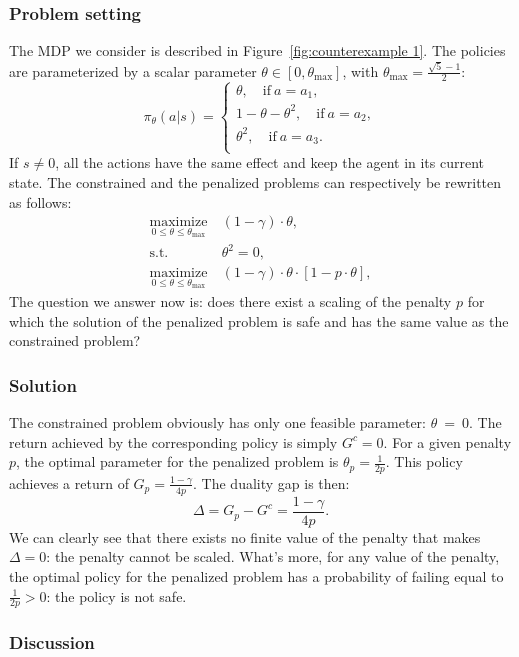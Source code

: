 \subsubsection{Problem setting} The MDP we consider is described in Figure~\ref{fig:counterexample 1}. The policies are parameterized by a scalar parameter $\theta\in[0,\theta_{\text{max}}]$, with $\theta_\text{max} = \frac{\sqrt{5}-1}{2}$:
$$
	\pi_\theta(a|s) = \begin{cases}
		\theta,\quad\text{if}~a=a_1,\\
		1 - \theta - \theta^2,\quad\text{if}~a=a_2,\\
		\theta^2,\quad\text{if}~a=a_3.\\
	\end{cases}
$$
If $s\neq0$, all the actions have the same effect and keep the agent in its current state. The constrained and the penalized problems can respectively be rewritten as follows:
\begin{align*}
	\underset{0\leq\theta\leq\theta_\text{max}}{\text{maximize}}&~(1-\gamma)\cdot\theta,\\
	\text{s.t.} &~\theta^2 = 0,\\
	\underset{0\leq\theta\leq\theta_\text{max}}{\text{maximize}}&~(1-\gamma)\cdot\theta\cdot\left[1 - p\cdot\theta\right],
\end{align*}
The question we answer now is: does there exist a scaling of the penalty $p$ for which the solution of the penalized problem is safe and has the same value as the constrained problem?

\subsubsection{Solution} The constrained problem obviously has only one feasible parameter: $\theta~=~0$. The return achieved by the corresponding policy is simply $G^c = 0$. For a given penalty $p$, the optimal parameter for the penalized problem is $\theta_p = \frac{1}{2p}$. This policy achieves a return of $G_p = \frac{1-\gamma}{4p}$. The duality gap is then:
$$
	\Delta = G_p - G^c = \frac{1-\gamma}{4p}.
$$
We can clearly see that there exists no finite value of the penalty that makes $\Delta = 0$: the penalty cannot be scaled. What's more, for any value of the penalty, the optimal policy for the penalized problem has a probability of failing equal to $\frac{1}{2p}>0$: the policy is not safe.

\subsubsection{Discussion} 
